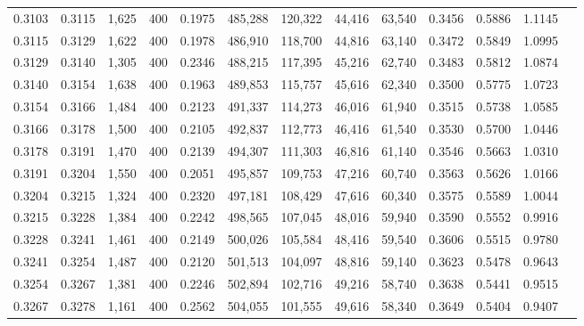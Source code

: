 \begin{tabular}{rrrrrrrrrrrrr}
0.3103 & 0.3115 &  1,625 &   400 &                                     0.1975 & 485,288 & 120,322 &  44,416 &  63,540 & 0.3456 & 0.5886 & 1.1145 \\
0.3115 & 0.3129 &  1,622 &   400 &                                     0.1978 & 486,910 & 118,700 &  44,816 &  63,140 & 0.3472 & 0.5849 & 1.0995 \\
0.3129 & 0.3140 &  1,305 &   400 &                                     0.2346 & 488,215 & 117,395 &  45,216 &  62,740 & 0.3483 & 0.5812 & 1.0874 \\
0.3140 & 0.3154 &  1,638 &   400 &                                     0.1963 & 489,853 & 115,757 &  45,616 &  62,340 & 0.3500 & 0.5775 & 1.0723 \\
0.3154 & 0.3166 &  1,484 &   400 &                                     0.2123 & 491,337 & 114,273 &  46,016 &  61,940 & 0.3515 & 0.5738 & 1.0585 \\
0.3166 & 0.3178 &  1,500 &   400 &                                     0.2105 & 492,837 & 112,773 &  46,416 &  61,540 & 0.3530 & 0.5700 & 1.0446 \\
0.3178 & 0.3191 &  1,470 &   400 &                                     0.2139 & 494,307 & 111,303 &  46,816 &  61,140 & 0.3546 & 0.5663 & 1.0310 \\
0.3191 & 0.3204 &  1,550 &   400 &                                     0.2051 & 495,857 & 109,753 &  47,216 &  60,740 & 0.3563 & 0.5626 & 1.0166 \\
0.3204 & 0.3215 &  1,324 &   400 &                                     0.2320 & 497,181 & 108,429 &  47,616 &  60,340 & 0.3575 & 0.5589 & 1.0044 \\
0.3215 & 0.3228 &  1,384 &   400 &                                     0.2242 & 498,565 & 107,045 &  48,016 &  59,940 & 0.3590 & 0.5552 & 0.9916 \\
0.3228 & 0.3241 &  1,461 &   400 &                                     0.2149 & 500,026 & 105,584 &  48,416 &  59,540 & 0.3606 & 0.5515 & 0.9780 \\
0.3241 & 0.3254 &  1,487 &   400 &                                     0.2120 & 501,513 & 104,097 &  48,816 &  59,140 & 0.3623 & 0.5478 & 0.9643 \\
0.3254 & 0.3267 &  1,381 &   400 &                                     0.2246 & 502,894 & 102,716 &  49,216 &  58,740 & 0.3638 & 0.5441 & 0.9515 \\
0.3267 & 0.3278 &  1,161 &   400 &                                     0.2562 & 504,055 & 101,555 &  49,616 &  58,340 & 0.3649 & 0.5404 & 0.9407 \\

\end{tabular}
